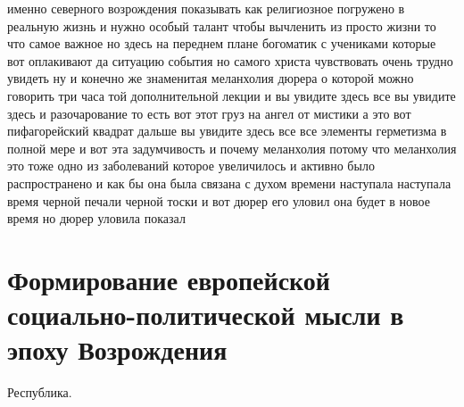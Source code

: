 именно северного возрождения показывать как религиозное погружено в реальную
жизнь и нужно особый талант чтобы вычленить из просто жизни то что самое важное
но здесь на переднем плане богоматик с учениками которые вот оплакивают да
ситуацию события но самого христа чувствовать очень трудно увидеть ну и конечно
же знаменитая меланхолия дюрера о которой можно говорить три часа той
дополнительной лекции и вы увидите здесь все вы увидите здесь и разочарование то
есть вот этот груз на ангел от мистики а это вот пифагорейский квадрат дальше вы
увидите здесь все все элементы герметизма в полной мере и вот эта задумчивость и
почему меланхолия потому что меланхолия это тоже одно из заболеваний которое
увеличилось и активно было распространено и как бы она была связана с духом
времени наступала наступала время черной печали черной тоски и вот дюрер его
уловил она будет в новое время но дюрер уловила показал 

\section{Формирование европейской социально-политической мысли в эпоху Возрождения}

Республика.

